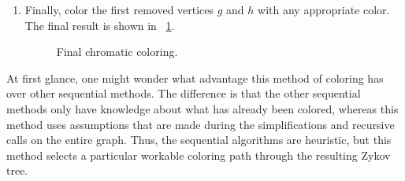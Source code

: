 \begin{enumerate}
\item Finally, color the first removed vertices \(g\) and \(h\) with any appropriate color.  The final result is
  shown in \figurename~\ref{fig:cfinal}.

  \begin{figure}[H]
    \centering
    \caption{Final chromatic coloring.}
    \label{fig:cfinal}
  \end{figure}

\end{enumerate}

At first glance, one might wonder what advantage this method of coloring has over other sequential methods.  The
difference is that the other sequential methods only have knowledge about what has already been colored, whereas
this method uses assumptions that are made during the simplifications and recursive calls on the entire graph.
Thus, the sequential algorithms are heuristic, but this method selects a particular workable coloring path through
the resulting Zykov tree.
